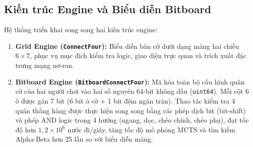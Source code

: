 \documentclass[11pt, a4paper]{article}
\begin{document}
\subsection{Kiến trúc Engine và Biểu diễn Bitboard}
Hệ thống triển khai song song hai kiến trúc engine:
\begin{enumerate}
    \item \textbf{Grid Engine (\texttt{ConnectFour}):} Biểu diễn bàn cờ dưới dạng mảng hai chiều $6 \times 7$, phục vụ mục đích kiểm tra logic, giao diện trực quan và trích xuất đặc trưng mạng nơ-ron.
    \item \textbf{Bitboard Engine (\texttt{BitboardConnectFour}):} Mã hóa toàn bộ cấu hình quân cờ của hai người chơi vào hai số nguyên 64-bit không dấu (\texttt{uint64}). Mỗi cột 6 ô được gán 7 bit (6 bit ô cờ + 1 bit đệm ngăn tràn). Thao tác kiểm tra 4 quân thẳng hàng được thực hiện song song bằng các phép dịch bit (bit-shift) và phép AND logic trong 4 hướng (ngang, dọc, chéo chính, chéo phụ), đạt tốc độ hơn $1{,}2 \times 10^6$ nước đi/giây, tăng tốc độ mô phỏng MCTS và tìm kiếm Alpha-Beta hơn 25 lần so với biểu diễn mảng.
\end{enumerate}
\end{document}
